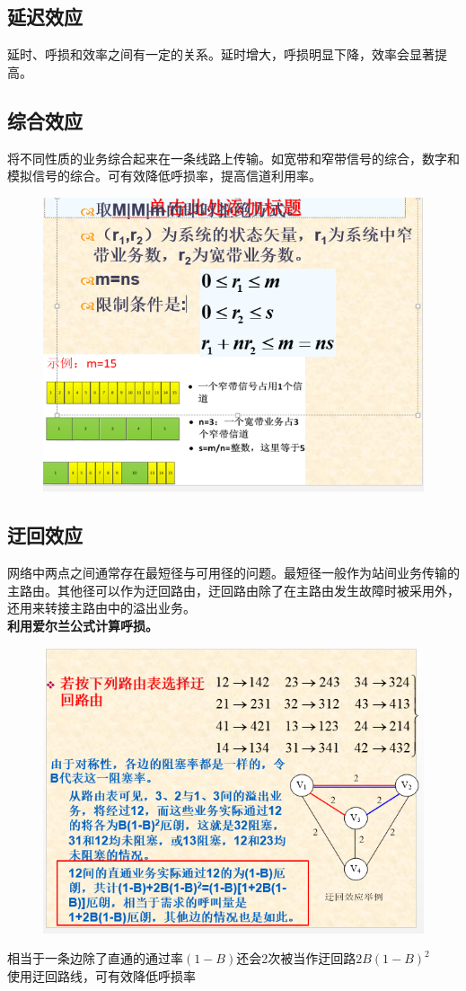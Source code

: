 \subsection{延迟效应}
延时、呼损和效率之间有一定的关系。延时增大，呼损明显下降，效率会显著提高。
\subsection{综合效应}
将不同性质的业务综合起来在一条线路上传输。如宽带和窄带信号的综合，数字和模拟信号的综合。可有效降低呼损率，提高信道利用率。
\begin{figure}[H]
	\centering
	\includegraphics[width=0.7\linewidth]{figures/screenshot037}
	\caption{}
	\label{fig:screenshot037}
\end{figure}

\subsection{迂回效应}
网络中两点之间通常存在最短径与可用径的问题。最短径一般作为站间业务传输的主路由。其他径可以作为迂回路由，迂回路由除了在主路由发生故障时被采用外，还用来转接主路由中的溢出业务。\\
\textbf{利用爱尔兰公式计算呼损。}\\
\begin{figure}[H]
	\centering
	\includegraphics[width=0.7\linewidth]{figures/screenshot038}
	\caption{}
	\label{fig:screenshot038}
\end{figure}
相当于一条边除了直通的通过率$ (1-B) $还会2次被当作迂回路$ 2B(1-B)^2 $\\
使用迂回路线，可有效降低呼损率

